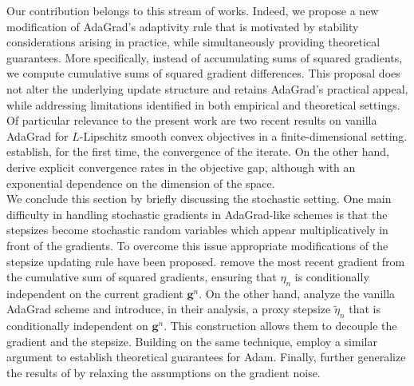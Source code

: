 \documentclass[11pt]{article}
\theoremstyle{plain}
\theoremstyle{definition}
\theoremstyle{remark}
\newcommand{\buu}{\bm{g}}
\newcommand{\iter}{n}
\begin{document}
\noindent
Our contribution belongs to this stream of works. Indeed, we propose a new modification of AdaGrad’s adaptivity rule that is motivated by stability considerations arising in practice, while simultaneously providing theoretical guarantees. More specifically, instead of accumulating sums of squared gradients, we compute cumulative sums of squared gradient differences. This proposal does not alter the underlying update structure and retains AdaGrad’s practical appeal, while addressing limitations identified in both empirical and theoretical settings.\\

\noindent
Of particular relevance to the present work are two recent results on vanilla AdaGrad for $L$-Lipschitz smooth convex objectives in a finite-dimensional setting. \citet{traore2021sequential} establish, for the first time, the convergence of the iterate. On the other hand, \citet{liu2022convergence} derive explicit convergence rates in the objective gap, although with an exponential dependence on the dimension of the space.\\

\noindent
We conclude this section by briefly discussing the stochastic setting.
One main difficulty in handling  stochastic gradients in AdaGrad-like schemes 
is that the stepsizes become stochastic random variables which appear multiplicatively in front of the gradients. To overcome this issue appropriate modifications of the stepsize updating rule have been proposed. \citet{li2019convergence} remove the most recent gradient from the cumulative sum of squared gradients, ensuring that $\eta_{\iter}$ is conditionally independent on the current gradient $\buu^\iter$.
On the other hand, \citet{ward2020adagrad} analyze the vanilla AdaGrad scheme and introduce, in their analysis, a proxy stepsize $\tilde{\eta}_\iter$ that is conditionally independent on $\buu^\iter$. This construction allows them to decouple the gradient and the stepsize. 
Building on the same technique, \citet{defossez2020simple} employ a similar argument to establish theoretical guarantees for Adam.
Finally, \citet{faw2022power} further generalize the results of \citet{ward2020adagrad} by relaxing the assumptions on the gradient noise.
\end{document}
